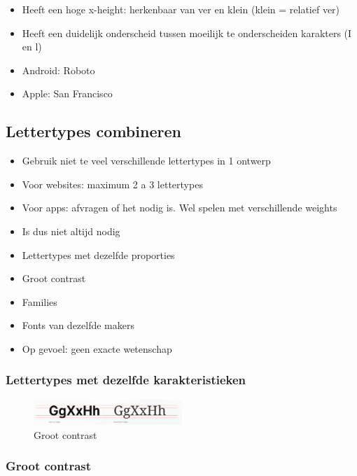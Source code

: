 \documentclass{article}
\begin{document}
\begin{itemize}
    \item Heeft een hoge x-height: herkenbaar van ver en klein (klein = relatief ver)
    \item Heeft een duidelijk onderscheid tussen moeilijk te onderscheiden karakters (I en l)
    \item Android: Roboto
    \item Apple: San Francisco
\end{itemize}

\subsection{Lettertypes combineren}
\begin{itemize}
    \item Gebruik niet te veel verschillende lettertypes in 1 ontwerp
    \item Voor websites: maximum 2 a 3 lettertypes
    \item Voor apps: afvragen of het nodig is. Wel spelen met verschillende weights
    \item Is dus niet altijd nodig
    \item Lettertypes met dezelfde proporties
    \item Groot contrast
    \item Families
    \item Fonts van dezelfde makers
    \item Op gevoel: geen exacte wetenschap
\end{itemize}

\subsubsection{Lettertypes met dezelfde karakteristieken}

\begin{figure}[H]
    \centering
    \includegraphics[width=0.5\textwidth]{img/Screenshot_20200224_100754.png}
    \caption{Groot contrast}
\end{figure}

\subsubsection{Groot contrast}
\end{document}
